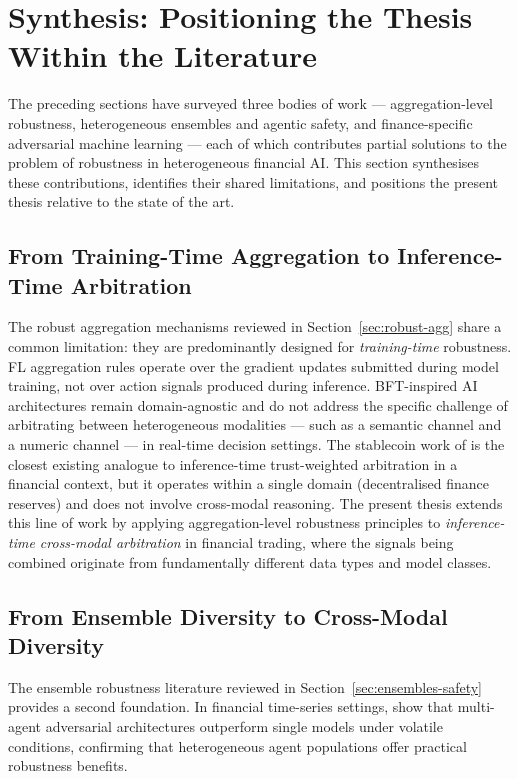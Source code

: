 \section{Synthesis: Positioning the Thesis Within the Literature}

The preceding sections have surveyed three bodies of work --- aggregation-level
robustness, heterogeneous ensembles and agentic safety, and finance-specific
adversarial machine learning --- each of which contributes partial solutions to
the problem of robustness in heterogeneous financial AI. This section synthesises
these contributions, identifies their shared limitations, and positions the
present thesis relative to the state of the art.

\subsection{From Training-Time Aggregation to Inference-Time Arbitration}

The robust aggregation mechanisms reviewed in Section~\ref{sec:robust-agg} share
a common limitation: they are predominantly designed for \textit{training-time}
robustness. FL aggregation rules operate over the gradient updates submitted during
model training, not over action signals produced during inference. BFT-inspired AI
architectures remain domain-agnostic and do not address the specific challenge of
arbitrating between heterogeneous modalities --- such as a semantic channel and a
numeric channel --- in real-time decision settings. The stablecoin work of
\cite{you_stablecoin_2026} is the closest existing analogue to inference-time
trust-weighted arbitration in a financial context, but it operates within a single
domain (decentralised finance reserves) and does not involve cross-modal reasoning.
The present thesis extends this line of work by applying aggregation-level robustness
principles to \textit{inference-time cross-modal arbitration} in financial trading,
where the signals being combined originate from fundamentally different data types
and model classes.


\subsection{From Ensemble Diversity to Cross-Modal Diversity}

The ensemble robustness literature reviewed in Section~\ref{sec:ensembles-safety}
provides a second foundation. In financial time-series settings,
\cite{qiao2025multiagent} show that multi-agent adversarial architectures outperform
single models under volatile conditions, confirming that heterogeneous agent
populations offer practical robustness benefits.

